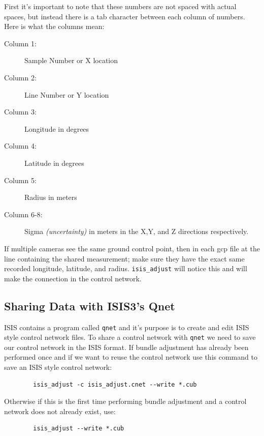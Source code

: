 First it's important to note that these numbers are not spaced with
actual spaces, but instead there is a tab character between each
column of numbers. Here is what the columns mean:

\begin{myindentpar}{2cm}
\begin{description}
  \item[Column 1:] Sample Number or X location
  \item[Column 2:] Line Number or Y location
  \item[Column 3:] Longitude in degrees
  \item[Column 4:] Latitude in degrees
  \item[Column 5:] Radius in meters
  \item[Column 6-8:] Sigma \emph{(uncertainty)} in meters in the X,Y,
    and Z directions respectively.
\end{description}
\end{myindentpar}

If multiple cameras see the same ground control point, then in each
gcp file at the line containing the shared measurement; make sure they
have the exact same recorded longitude, latitude, and
radius. \texttt{isis\_adjust} will notice this and will make the
connection in the control network.

\subsection{Sharing Data with ISIS3's Qnet}

ISIS contains a program called \texttt{qnet} and it's purpose is to
create and edit ISIS style control network files. To share a control
network with \texttt{qnet} we need to save our control network in the
ISIS format. If bundle adjustment has already been performed once and
if we want to reuse the control network use this command to save an
ISIS style control network:

\begin{verbatim}
        isis_adjust -c isis_adjust.cnet --write *.cub
\end{verbatim}

Otherwise if this is the first time performing bundle adjustment and a
control network does not already exist, use:

\begin{verbatim}
        isis_adjust --write *.cub
\end{verbatim}

